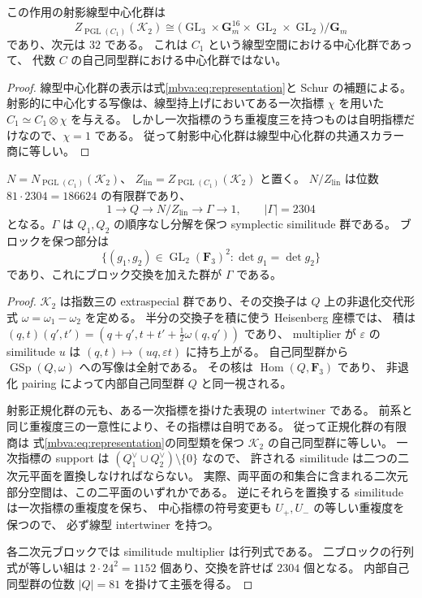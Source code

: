 \begin{corollary}[線型空間内の中心化群]
\label{mbva:cor:linear-centralizer}
この作用の射影線型中心化群は
\[
 Z_{\operatorname{PGL}(C_1)}(\mathcal K_2)
 \cong
 \bigl(\operatorname{GL}_3\times\mathbf G_m^{16}
                  \times\operatorname{GL}_2\times\operatorname{GL}_2\bigr)/\mathbf G_m
\]
であり、次元は $32$ である。
これは $C_1$ という線型空間における中心化群であって、
代数 $C$ の自己同型群における中心化群ではない。
\end{corollary}
\begin{proof}
線型中心化群の表示は式\eqref{mbva:eq:representation}と Schur の補題による。
射影的に中心化する写像は、線型持上げにおいてある一次指標 $\chi$ を用いた
$C_1\simeq C_1\otimes\chi$ を与える。
しかし一次指標のうち重複度三を持つものは自明指標だけなので、$\chi=1$ である。
従って射影中心化群は線型中心化群の共通スカラー商に等しい。
\end{proof}

\begin{proposition}[線型空間内の正規化群の有限商]
\label{mbva:prop:linear-normalizer}
$N= N_{\operatorname{PGL}(C_1)}(\mathcal K_2)$、
$Z_{\mathrm{lin}}= Z_{\operatorname{PGL}(C_1)}(\mathcal K_2)$ と置く。
$N/Z_{\mathrm{lin}}$ は位数 $81\cdot2304=186624$ の有限群であり、
\[
 1\longrightarrow Q
 \longrightarrow N/Z_{\mathrm{lin}}
 \longrightarrow\Gamma\longrightarrow1,\qquad
 |\Gamma|=2304
\]
となる。$\Gamma$ は $Q_1,Q_2$ の順序なし分解を保つ symplectic similitude 群である。
ブロックを保つ部分は
\[
 \{(g_1,g_2)\in\operatorname{GL}_2(\mathbf F_3)^2:
                    \det g_1=\det g_2\}
\]
であり、これにブロック交換を加えた群が $\Gamma$ である。
\end{proposition}
\begin{proof}
$\mathcal K_2$ は指数三の extraspecial 群であり、その交換子は
$Q$ 上の非退化交代形式 $\omega=\omega_1-\omega_2$ を定める。
半分の交換子を積に使う Heisenberg 座標では、
積は $(q,t)(q',t')=(q+q',t+t'+\tfrac12\omega(q,q'))$ であり、
multiplier が $\varepsilon$ の similitude $u$ は
$(q,t)\mapsto(uq,\varepsilon t)$ に持ち上がる。
自己同型群から $\operatorname{GSp}(Q,\omega)$ への写像は全射である。
その核は $\operatorname{Hom}(Q,\mathbf F_3)$ であり、
非退化 pairing によって内部自己同型群 $Q$ と同一視される。

射影正規化群の元も、ある一次指標を掛けた表現の intertwiner である。
前系と同じ重複度三の一意性により、その指標は自明である。
従って正規化群の有限商は
式\eqref{mbva:eq:representation}の同型類を保つ $\mathcal K_2$ の自己同型群に等しい。
一次指標の support は
$(Q_1^\vee\cup Q_2^\vee)\setminus\{0\}$ なので、
許される similitude は二つの二次元平面を置換しなければならない。
実際、両平面の和集合に含まれる二次元部分空間は、この二平面のいずれかである。
逆にそれらを置換する similitude は一次指標の重複度を保ち、
中心指標の符号変更も $U_+,U_-$ の等しい重複度を保つので、
必ず線型 intertwiner を持つ。

各二次元ブロックでは similitude multiplier は行列式である。
二ブロックの行列式が等しい組は
$2\cdot24^2=1152$ 個あり、交換を許せば $2304$ 個となる。
内部自己同型群の位数 $|Q|=81$ を掛けて主張を得る。
\end{proof}

